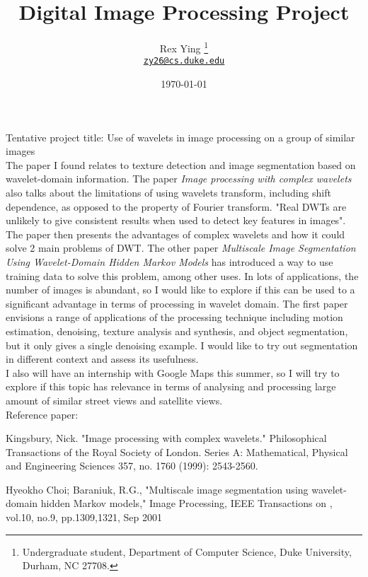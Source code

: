 \documentclass[11pt]{article}
\title{\textbf{Digital Image Processing Project}}
\author{Rex Ying%
  \thanks{Undergraduate student, Department of Computer Science, Duke
  University, Durham, NC 27708.}\\
  \href{mailto:zy26@cs.duke.edu}{\texttt{zy26@cs.duke.edu}}
}
\date{\today}
\numberwithin{equation}{section}
\numberwithin{figure}{section}
\numberwithin{table}{section}
\numberwithin{code}{section}
\begin{document}
\maketitle
\onehalfspacing


Tentative project title: Use of wavelets in image processing on a group of similar images \\

The paper I found relates to texture detection and image segmentation based on wavelet-domain information.
The paper \emph{Image processing with complex wavelets} also talks about the limitations of using wavelets
transform, including shift dependence, as opposed to the property of Fourier transform. 
"Real DWTs are unlikely to
give consistent results when used to detect key features in images". 
The paper then presents the advantages of complex wavelets and how it could solve 2 main problems of DWT.
The other paper 
\emph{Multiscale Image Segmentation Using Wavelet-Domain Hidden Markov Models} has introduced a way to
use training data to solve this problem, among other uses. 
In lots of applications, the number of images is abundant, so I would like to explore if this can be used
to a significant advantage in terms of processing in wavelet domain.
The first paper envisions a range of applications
of the processing technique including motion estimation, denoising, texture analysis and synthesis, and object segmentation, but it only gives a single denoising example.
 I would like to try out segmentation in different context and assess its usefulness. \\

I also will have an internship with Google Maps this summer, so I will try to explore if this topic 
has relevance in terms of analysing and processing large amount of similar street views and satellite views. \\

Reference paper:

Kingsbury, Nick. "Image processing with complex wavelets." Philosophical Transactions of the Royal Society of London. Series A: Mathematical, Physical and Engineering Sciences 357, no. 1760 (1999): 2543-2560.

Hyeokho Choi; Baraniuk, R.G., "Multiscale image segmentation using wavelet-domain hidden Markov models," Image Processing, IEEE Transactions on , vol.10, no.9, pp.1309,1321, Sep 2001






\label{sec:references}
{}

\end{document}
